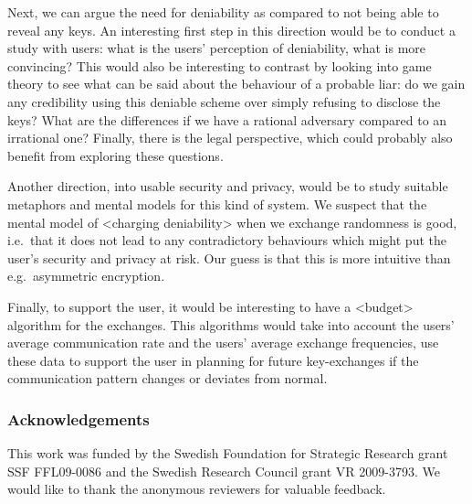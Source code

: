 Next, we can argue the need for deniability as compared to not being able to 
reveal any keys.
An interesting first step in this direction would be to conduct a study with 
users: what is the users' perception of deniability, what is more convincing?
This would also be interesting to contrast by looking into game theory to see 
what can be said about the behaviour of a probable liar: do we gain any 
credibility using this deniable scheme over simply refusing to disclose the 
keys?
What are the differences if we have a rational adversary compared to an 
irrational one?
Finally, there is the legal perspective, which could probably also benefit from 
exploring these questions.

Another direction, into usable security and privacy, would be to study suitable 
metaphors and mental models for this kind of system.
We suspect that the mental model of <charging deniability> when we exchange 
randomness is good, i.e.~that it does not lead to any contradictory behaviours 
which might put the user's security and privacy at risk.
Our guess is that this is more intuitive than e.g.~asymmetric encryption.

Finally, to support the user, it would be interesting to have a <budget> 
algorithm for the exchanges.
This algorithms would take into account the users' average communication rate 
and the users' average exchange frequencies, use these data to support the user 
in planning for future key-exchanges if the communication pattern changes or 
deviates from normal.


\subsubsection*{Acknowledgements}

This work was funded by the Swedish Foundation for Strategic Research grant SSF 
FFL09-0086 and the Swedish Research Council grant VR 2009-3793.
We would like to thank the anonymous reviewers for valuable feedback.


\printbibliography{}

